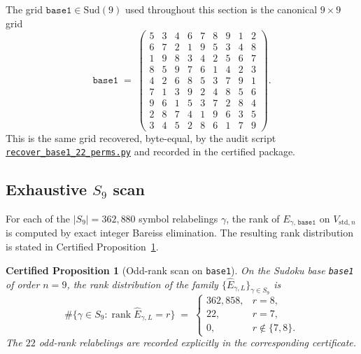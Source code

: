 \documentclass[11pt,a4paper]{article}
\newtheorem{certprop}[theorem]{Certified Proposition}
\theoremstyle{definition}
\theoremstyle{remark}
\providecommand{\rank}{\operatorname{rank}}
\newcommand{\Vstdn}{V_{\mathrm{std},n}}
\newcommand{\Ehat}{\widehat{E}_{\gamma,L}}
\begin{document}
The grid $\texttt{base1} \in \mathrm{Sud}(9)$ used throughout this
section is the canonical $9 \times 9$ grid
\begin{equation}\label{eq:base1-grid}
   \texttt{base1} \;=\;
   \begin{pmatrix}
      5 & 3 & 4 & 6 & 7 & 8 & 9 & 1 & 2 \\
      6 & 7 & 2 & 1 & 9 & 5 & 3 & 4 & 8 \\
      1 & 9 & 8 & 3 & 4 & 2 & 5 & 6 & 7 \\
      8 & 5 & 9 & 7 & 6 & 1 & 4 & 2 & 3 \\
      4 & 2 & 6 & 8 & 5 & 3 & 7 & 9 & 1 \\
      7 & 1 & 3 & 9 & 2 & 4 & 8 & 5 & 6 \\
      9 & 6 & 1 & 5 & 3 & 7 & 2 & 8 & 4 \\
      2 & 8 & 7 & 4 & 1 & 9 & 6 & 3 & 5 \\
      3 & 4 & 5 & 2 & 8 & 6 & 1 & 7 & 9
   \end{pmatrix}.
\end{equation}
This is the same grid recovered, byte-equal, by the audit script
\href{../certified/recover_base1_22_perms.py}{\texttt{recover\_base1\_22\_perms.py}}
and recorded in the certified package.

\subsection{\texorpdfstring{Exhaustive $S_9$ scan}{Exhaustive S9 scan}}\label{sec:base1-scan}

For each of the $|S_9| = 362{,}880$ symbol relabelings $\gamma$, the
rank of $E_{\gamma,\,\texttt{base1}}$ on $\Vstdn$ is computed
by exact integer Bareiss elimination. The resulting rank distribution
is stated in Certified Proposition~\ref{thm:base1-22}.

\begin{certprop}[Odd-rank scan on \texttt{base1}]
\label{thm:base1-22}
On the Sudoku base \texttt{base1} of order $n = 9$, the rank
distribution of the family $\{\Ehat\}_{\gamma \in S_9}$ is
\begin{equation}\label{eq:base1-rank-distribution}
   \#\bigl\{\gamma \in S_9 : \rank \Ehat = r\bigr\}
   \;=\;
   \begin{cases}
      362{,}858, & r = 8, \\
      22,        & r = 7, \\
      0,         & r \notin \{7, 8\}.
   \end{cases}
\end{equation}
The $22$ odd-rank relabelings are recorded explicitly in the
corresponding certificate.
\end{certprop}
\end{document}

